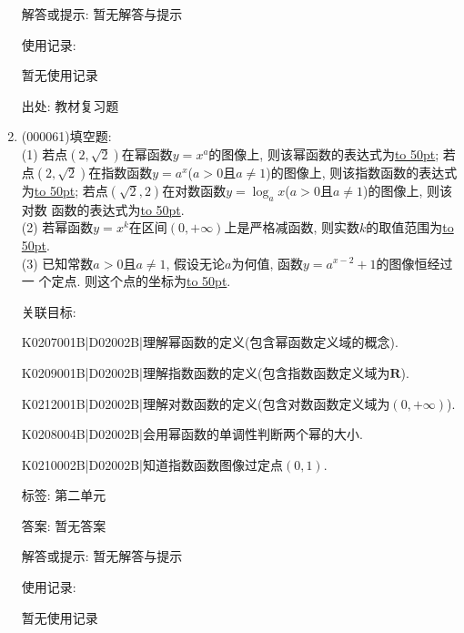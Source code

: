 \documentclass[10pt,a4paper]{article}
\newcommand{\blank}[1]{\underline{\hbox to #1pt{}}}
\begin{document}
\begin{enumerate}[1.]
解答或提示: 暂无解答与提示

使用记录:

暂无使用记录


出处: 教材复习题
\item { (000061)}填空题:\\
(1) 若点$(2, \sqrt 2)$在幂函数$y=x^a$的图像上, 则该幂函数的表达式为\blank{50}; 若点$(2, \sqrt 2)$在指数函数$y=a^x$($a>0$且$a\ne 1$)的图像上, 则该指数函数的表达式为\blank{50}; 若点$(\sqrt 2, 2)$在对数函数$y=\log_a x$($a>0$且$a\ne 1$)的图像上, 则该对数
函数的表达式为\blank{50}.\\
(2) 若幂函数$y=x^k$在区间$(0, +\infty)$上是严格减函数, 则实数$k$的取值范围为\blank{50}.\\
(3) 已知常数$a>0$且$a\ne 1$, 假设无论$a$为何值, 函数$y=a^{x-2}+1$的图像恒经过一
个定点. 则这个点的坐标为\blank{50}.


关联目标:

K0207001B|D02002B|理解幂函数的定义(包含幂函数定义域的概念).

K0209001B|D02002B|理解指数函数的定义(包含指数函数定义域为$\mathbf{R}$).

K0212001B|D02002B|理解对数函数的定义(包含对数函数定义域为$(0,+\infty)$).

K0208004B|D02002B|会用幂函数的单调性判断两个幂的大小.

K0210002B|D02002B|知道指数函数图像过定点$(0,1)$.



标签: 第二单元

答案: 暂无答案

解答或提示: 暂无解答与提示

使用记录:

暂无使用记录



\end{enumerate}
\end{document}
